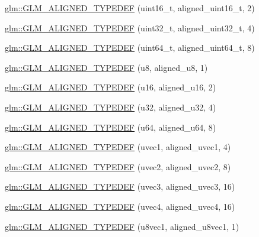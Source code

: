 \begin{DoxyCompactItemize}
\item 
\hyperlink{group__gtx__type__aligned_gafbc7fb7847bfc78a339d1d371c915c73}{glm\-::\-G\-L\-M\-\_\-\-A\-L\-I\-G\-N\-E\-D\-\_\-\-T\-Y\-P\-E\-D\-E\-F} (uint16\-\_\-t, aligned\-\_\-uint16\-\_\-t, 2)
\item 
\hyperlink{group__gtx__type__aligned_gaa86bc56a73fd8120b1121b5f5e6245ae}{glm\-::\-G\-L\-M\-\_\-\-A\-L\-I\-G\-N\-E\-D\-\_\-\-T\-Y\-P\-E\-D\-E\-F} (uint32\-\_\-t, aligned\-\_\-uint32\-\_\-t, 4)
\item 
\hyperlink{group__gtx__type__aligned_ga68c0b9e669060d0eb5ab8c3ddeb483d8}{glm\-::\-G\-L\-M\-\_\-\-A\-L\-I\-G\-N\-E\-D\-\_\-\-T\-Y\-P\-E\-D\-E\-F} (uint64\-\_\-t, aligned\-\_\-uint64\-\_\-t, 8)
\item 
\hyperlink{group__gtx__type__aligned_ga4f3bab577daf3343e99cc005134bce86}{glm\-::\-G\-L\-M\-\_\-\-A\-L\-I\-G\-N\-E\-D\-\_\-\-T\-Y\-P\-E\-D\-E\-F} (u8, aligned\-\_\-u8, 1)
\item 
\hyperlink{group__gtx__type__aligned_ga13a2391339d0790d43b76d00a7611c4f}{glm\-::\-G\-L\-M\-\_\-\-A\-L\-I\-G\-N\-E\-D\-\_\-\-T\-Y\-P\-E\-D\-E\-F} (u16, aligned\-\_\-u16, 2)
\item 
\hyperlink{group__gtx__type__aligned_ga197570e03acbc3d18ab698e342971e8f}{glm\-::\-G\-L\-M\-\_\-\-A\-L\-I\-G\-N\-E\-D\-\_\-\-T\-Y\-P\-E\-D\-E\-F} (u32, aligned\-\_\-u32, 4)
\item 
\hyperlink{group__gtx__type__aligned_ga0f033b21e145a1faa32c62ede5878993}{glm\-::\-G\-L\-M\-\_\-\-A\-L\-I\-G\-N\-E\-D\-\_\-\-T\-Y\-P\-E\-D\-E\-F} (u64, aligned\-\_\-u64, 8)
\item 
\hyperlink{group__gtx__type__aligned_ga509af83527f5cd512e9a7873590663aa}{glm\-::\-G\-L\-M\-\_\-\-A\-L\-I\-G\-N\-E\-D\-\_\-\-T\-Y\-P\-E\-D\-E\-F} (uvec1, aligned\-\_\-uvec1, 4)
\item 
\hyperlink{group__gtx__type__aligned_ga94e86186978c502c6dc0c0d9c4a30679}{glm\-::\-G\-L\-M\-\_\-\-A\-L\-I\-G\-N\-E\-D\-\_\-\-T\-Y\-P\-E\-D\-E\-F} (uvec2, aligned\-\_\-uvec2, 8)
\item 
\hyperlink{group__gtx__type__aligned_ga5cec574686a7f3c8ed24bb195c5e2d0a}{glm\-::\-G\-L\-M\-\_\-\-A\-L\-I\-G\-N\-E\-D\-\_\-\-T\-Y\-P\-E\-D\-E\-F} (uvec3, aligned\-\_\-uvec3, 16)
\item 
\hyperlink{group__gtx__type__aligned_ga47edfdcee9c89b1ebdaf20450323b1d4}{glm\-::\-G\-L\-M\-\_\-\-A\-L\-I\-G\-N\-E\-D\-\_\-\-T\-Y\-P\-E\-D\-E\-F} (uvec4, aligned\-\_\-uvec4, 16)
\item 
\hyperlink{group__gtx__type__aligned_ga5611d6718e3a00096918a64192e73a45}{glm\-::\-G\-L\-M\-\_\-\-A\-L\-I\-G\-N\-E\-D\-\_\-\-T\-Y\-P\-E\-D\-E\-F} (u8vec1, aligned\-\_\-u8vec1, 1)

\end{DoxyCompactItemize}
